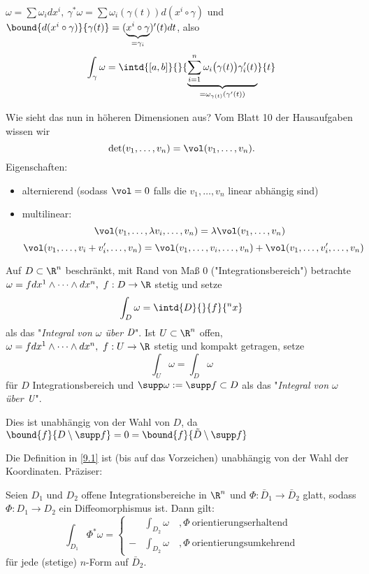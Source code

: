 \( \omega = \sum \omega_i dx^i,\ \gamma^*\omega = \sum \omega_i(\gamma(t)) d(x^i \circ \gamma) \) und \( \bound{d(x^i \circ \gamma)}{\gamma(t)} = ( \underbrace{x^i \circ \gamma}_{=\gamma_i})'(t) dt \), also
\[ \int_\gamma \omega = \intd{[a,b]}{}{\underbrace{\sum_{i=1}^{n} \omega_i \big(\gamma(t)\big) \gamma_i'(t)}_{= \omega_{\gamma(t)} (\gamma'(t))}}{t} \]

Wie sieht das nun in höheren Dimensionen aus? Vom Blatt 10 der Hausaufgaben wissen wir
\[ \det(v_1,\dotsc,v_n) = \vol(v_1,\dotsc,v_n). \]
Eigenschaften:
\begin{itemize}
	\item alternierend (sodass $\vol=0$ falls die \( v_1,\dotsc,v_n \) linear abhängig sind)
	\item multilinear:
		\[ \vol(v_1,\dotsc,\lambda v_i,\dotsc,v_n) = \lambda \vol(v_1,\dotsc,v_n) \]
		\[ \vol(v_1,\dotsc,v_i + v_i',\dotsc,v_n) = \vol(v_1,\dotsc,v_i,\dotsc,v_n) + \vol(v_1,\dotsc,v_i',\dotsc,v_n) \]
\end{itemize}

\begin{defn}\label{9.1}
	Auf \( D \subset \R^n \) beschränkt, mit Rand von Maß 0 ("Integrationsbereich") betrachte \( \omega = f dx^1 \wedge \dots \wedge dx^n,\ f:D \to \R \) stetig und setze 
	\[ \int_D \omega = \intd{D}{}{f}{^n x} \]
	als das "\emph{Integral von $\omega$ über $\emph{D}$}". Ist \( U \subset \R^n \) offen, \( \omega = f dx^1 \wedge \dots \wedge dx^n,\ f:U \to \R \) stetig und kompakt getragen, setze
	\[ \int_U \omega = \int_D \omega \]
	für $D$ Integrationsbereich und $\supp \omega  := \supp f \subset D$ als das "\emph{Integral von $\omega$ über $\emph{U}$}".
\end{defn}

\begin{rem*}
	Dies ist unabhängig von der Wahl von $D$, da \( \bound{f}{D \setminus \supp f} = 0 = \bound{f}{\tilde{D} \setminus \supp f} \)
\end{rem*}

Die Definition in \ref{9.1} ist (bis auf das Vorzeichen) unabhängig von der Wahl der Koordinaten. Präziser:

\begin{lem}
	Seien $D_1$ und $D_2$ offene Integrationsbereiche in $\R^n$ und \( \Phi: \bar{D}_1 \to \bar{D}_2 \) glatt, sodass \( \Phi: D_1 \to D_2 \) ein Diffeomorphismus ist. Dann gilt:
	\[ \int_{D_1} \Phi^*\omega = \begin{cases}
		&\int_{D_2} \omega \quad , \Phi\ \text{orientierungserhaltend} \\ -&\int_{D_2} \omega \quad , \Phi\ \text{orientierungsumkehrend}
	\end{cases} \]
	für jede (stetige) $n$-Form auf $\bar{D}_2$.
\end{lem}

